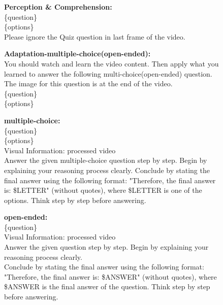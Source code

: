 \documentclass{llmxive}
\begin{document}
\begin{figure}[h]
\begin{tcolorbox}[colback=black!7.5!white, colframe=black!80!white, title=VideoMMMU -- For other models, fontupper=\footnotesize, fontlower=\footnotesize, fonttitle=\footnotesize]

\textbf{Perception \& Comprehension:}\\
\{question\}\\
\{options\}\\
Please ignore the Quiz question in last frame of the video.

\tcblower
\textbf{Adaptation-multiple-choice(open-ended):}\\
You should watch and learn the video content. Then apply what you learned to answer the
following multi-choice(open-ended) question. The image for this question is at the end of the video.\\
\{question\}\\
\{options\}
\end{tcolorbox}
\end{figure}

\begin{figure}[h]
\begin{tcolorbox}[colback=black!7.5!white, colframe=black!80!white, title={MMVU -- For Qwen series models and InternVL3.5-8B}, fontupper=\footnotesize, fontlower=\footnotesize, fonttitle=\footnotesize]

\textbf{multiple-choice:}\\
\{question\}\\
\{options\}\\
Visual Information: processed video\\
Answer the given multiple-choice question step by step. Begin by explaining your
reasoning process clearly. Conclude by stating the final answer using the following
format: "Therefore, the final answer is: \$LETTER" (without quotes), where \$LETTER is one of the options. Think step by step before answering.

\tcblower
\textbf{open-ended:}\\
\{question\}\\
Visual Information: processed video\\
Answer the given question step by step. Begin by explaining your reasoning process
clearly.\\
Conclude by stating the final answer using the following format: "Therefore, the final answer is: \$ANSWER" (without quotes), where \$ANSWER is the final answer of the question. Think step by step before answering.

\end{tcolorbox}
\end{figure}
\end{document}
